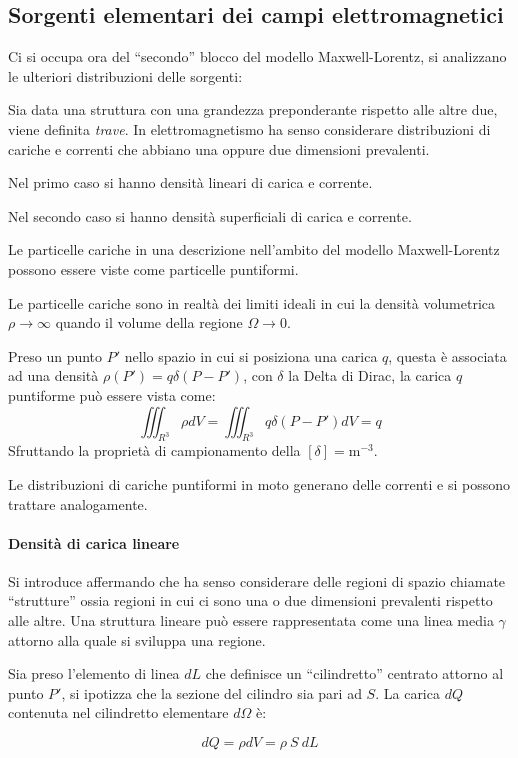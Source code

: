 
\subsection{Sorgenti elementari dei campi elettromagnetici}
Ci si occupa ora del ``secondo'' blocco del modello Maxwell-Lorentz, si analizzano le ulteriori 
distribuzioni delle sorgenti:

Sia data una struttura con una grandezza preponderante rispetto alle altre due, viene definita 
\textit{trave}.
In elettromagnetismo ha senso considerare distribuzioni di cariche e correnti che abbiano una oppure
due dimensioni prevalenti.

Nel primo caso si hanno densità lineari di carica e corrente.

Nel secondo caso si hanno densità superficiali di carica e corrente.

Le particelle cariche in una descrizione nell'ambito del modello Maxwell-Lorentz possono 
essere viste come particelle puntiformi.

Le particelle cariche sono in realtà dei limiti ideali in cui la densità volumetrica 
$\rho\to \infty$ quando il volume della regione $\Omega \to 0$.

Preso un punto $P'$ nello spazio in cui si posiziona una carica $q$, questa è associata ad una densità
$\rho(P') = q\delta(P-P')$, con $\delta$ la Delta di Dirac,
la carica $q$ puntiforme può essere vista come:
$$
\iiint_{R^3} \rho dV = \iiint_{R^3} q\delta(P-P')dV = q
$$
Sfruttando la proprietà di campionamento della $[\delta]= \si{\meter^{-3}}$.

Le distribuzioni di cariche puntiformi in moto generano delle correnti e si possono trattare 
analogamente.

\paragraph{Densità di carica lineare}
Si introduce affermando che ha senso considerare delle regioni di spazio chiamate ``strutture''
ossia regioni in cui ci sono una o due dimensioni prevalenti rispetto alle altre.
Una struttura lineare può essere rappresentata come una linea media $\gamma$ attorno alla quale
si sviluppa una regione.

Sia preso l'elemento di linea $dL$ che definisce un ``cilindretto'' centrato attorno
al punto $P'$, si ipotizza che la sezione del cilindro sia pari ad $S$.
La carica $dQ$ contenuta nel cilindretto elementare $d\Omega$ è:

$$
dQ = \rho dV = \rho\ S\ dL
$$

